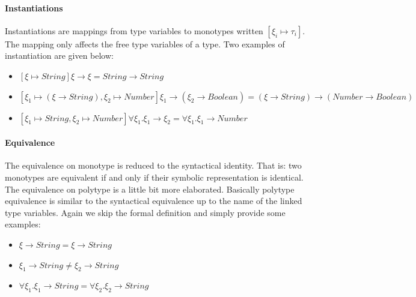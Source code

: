\documentclass[a4paper]{report}
\begin{document}
\paragraph{Instantiations} Instantiations are mappings from type variables to monotypes written $[\xi_i\mapsto\tau_i]$. The mapping only affects the free type variables of a type. Two examples of instantiation are given below:
\begin{itemize}
\item $\left[\xi\mapsto String\right]\xi\to\xi=String\to String$
\item $\left[\xi_1\mapsto(\xi\to String), \xi_2\mapsto Number\right]\xi_1\to(\xi_2\to Boolean)=(\xi\to String)\to (Number\to Boolean)$
\item $\left[\xi_1\mapsto String,\xi_2\mapsto Number\right]\forall \xi_1.\xi_1\to\xi_2=\forall\xi_1.\xi_1\to Number$
\end{itemize}

\paragraph{Equivalence} The equivalence on monotype is reduced to the syntactical identity. That is: two monotypes are equivalent if and only if their symbolic representation is identical. The equivalence on polytype is a little bit more elaborated. Basically polytype equivalence is similar to the syntactical equivalence up to the name of the linked type variables. Again we skip the formal definition and simply provide some examples:
\begin{itemize}
\item $\xi\to String = \xi\to String$
\item $\xi_1\to String \neq \xi_2\to String$
\item $\forall\xi_1.\xi_1\to String = \forall\xi_2.\xi_2\to String$
\end{itemize}
\end{document}
